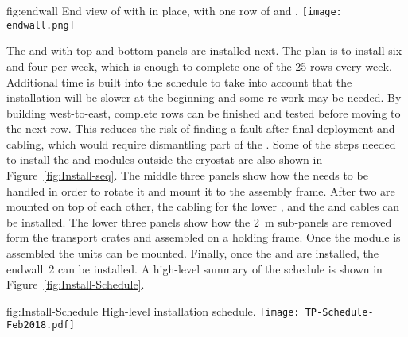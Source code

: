 \begin{dunefigure}{fig:endwall}
  {End view of  with  in
  place, with one row of  and .}
\texttt{[image: endwall.png]}
\end{dunefigure}

The  and  with top and bottom  panels are
installed next. The plan is to install six  and four
 per week, which is enough to complete one of the \num{25}
rows every week. Additional time is built into the schedule to take
into account that the installation will be slower at the beginning and
some re-work may be needed. By building west-to-east, complete rows can
be finished and tested before moving to the next row. This reduces the
risk of finding a fault after final  deployment and cabling,
which would require dismantling part of the . Some of the steps
needed to install the  and  modules outside the
cryostat are also shown in Figure~\ref{fig:Install-seq}.  The middle three
panels show how the  needs to be handled in order to rotate
it and mount it to the assembly frame. After two  are
mounted on top of each other, the cabling for the lower , and the
 and  cables can be installed. The
lower three panels show how the \SI{2}{m}  sub-panels are
removed form the transport crates and assembled on a holding frame. Once
the  module is assembled the  units can be
mounted. Finally, once the  and  are installed,
the endwall~2 can be installed. A high-level summary of the schedule
is shown in Figure~\ref{fig:Install-Schedule}.

\begin{dunefigure}{fig:Install-Schedule}
  {High-level installation schedule.}
 \texttt{[image: TP-Schedule-Feb2018.pdf]}
\end{dunefigure}


